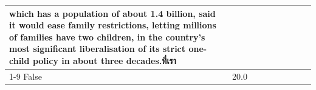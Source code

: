 \begin{table}[H]
\begin{tabular}{lllrlllll}
which has a population of about 1.4 billion, said it would ease family restrictions, letting millions of families have two children, in the country's most significant liberalisation of its strict one-child policy in about three decades.ที่เรา \\
\cline{1-9}
False & 20.0%
\end{tabular}
\end{table}
